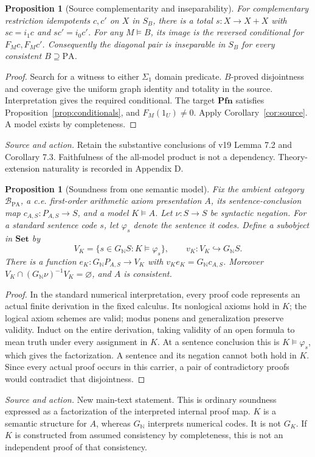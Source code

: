 \documentclass[11pt]{article}
\newtheorem{proposition}[theorem]{Proposition}
\theoremstyle{definition}\newtheorem{definition}[theorem]{Definition}
\newcommand{\PA}{\mathrm{PA}}
\newcommand{\N}{\mathbb N}
\newcommand{\Set}{\mathbf{Set}}
\newcommand{\Pfn}{\mathbf{Pfn}}
\newcommand{\B}{\mathcal B}
\newcommand{\source}[1]{\par\smallskip\noindent\textit{Source and action.} #1\par\smallskip}
\begin{document}
\begin{proposition}[Source complementarity and inseparability]\label{prop:st-pair}
For complementary restriction idempotents $c,c'$ on $X$ in $S_B$,
there is a total $s:X\to X+X$ with $sc=i_1c$ and $sc'=i_0c'$.
For any $M\models B$, its image is the reversed conditional for
$F_Mc,F_Mc'$. Consequently the diagonal pair is inseparable in
$S_B$ for every consistent $B\supseteq\PA$.
\end{proposition}
\begin{proof}
Search for a witness to either $\Sigma_1$ domain predicate.
$B$-proved disjointness and coverage give the uniform graph identity
and totality in the source. Interpretation gives the required
conditional. The target $\Pfn$ satisfies
Proposition~\ref{prop:conditionals}, and $F_M(1_U)\ne0$.
Apply Corollary~\ref{cor:source}. A model exists by completeness.
\end{proof}
\source{Retain the substantive conclusions of v19 Lemma 7.2 and Corollary 7.3. Faithfulness of the all-model product is not a dependency. Theory-extension naturality is recorded in Appendix D.}

\begin{proposition}[Soundness from one semantic model]\label{prop:soundness}
Fix the ambient category $\B_{\PA}$, a c.e. first-order arithmetic
axiom presentation $A$, its sentence-conclusion map
$c_{A,S}:P_{A,S}\to S$, and a model $K\models A$.
Let $\nu:S\to S$ be syntactic negation. For a standard sentence
code $s$, let $\varphi_s$ denote the sentence it codes.
Define a subobject in $\Set$ by
\[
 V_K=\{s\in G_{\N}S:K\models\varphi_s\},\qquad
 v_K:V_K\hookrightarrow G_{\N}S.
\]
There is a function $e_K:G_{\N}P_{A,S}\to V_K$ with
$v_Ke_K=G_{\N}c_{A,S}$. Moreover
$V_K\cap(G_{\N}\nu)^{-1}V_K=\varnothing$, and $A$ is consistent.
\end{proposition}
\begin{proof}
In the standard numerical interpretation, every proof code represents
an actual finite derivation in the fixed calculus. Its nonlogical
axioms hold in $K$; the logical axiom schemes are valid; modus ponens
and generalization preserve validity. Induct on the entire derivation,
taking validity of an open formula to mean truth under every
assignment in $K$. At a sentence conclusion this is
$K\models\varphi_s$, which gives the factorization.
A sentence and its negation cannot both
hold in $K$. Since every actual proof occurs in this carrier, a
pair of contradictory proofs would contradict that disjointness.
\end{proof}
\source{New main-text statement. This is ordinary soundness expressed as a factorization of the interpreted internal proof map. $K$ is a semantic structure for $A$, whereas $G_{\N}$ interprets numerical codes. It is not $G_K$. If $K$ is constructed from assumed consistency by completeness, this is not an independent proof of that consistency.}
\end{document}

